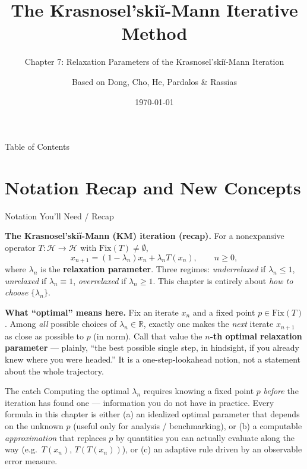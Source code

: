 \documentclass[aspectratio=169,10pt]{beamer}
\title[KM Method -- Ch.7]{The Krasnosel'ski\u{i}-Mann Iterative Method}
\subtitle{Chapter 7: Relaxation Parameters of the Krasnosel'ski\u{i}-Mann Iteration}
\author{Based on Dong, Cho, He, Pardalos \& Rassias}
\date{\today}
\newcommand{\mHH}{\mathcal H}
\newcommand{\Fix}{\mathrm{Fix}}
\newcommand{\R}{\mathbb{R}}
\begin{document}
\begin{frame}
  \titlepage
\end{frame}

\begin{frame}{Table of Contents}
  \tableofcontents
\end{frame}

\section{Notation Recap and New Concepts}

\begin{frame}[allowframebreaks]{Notation You'll Need / Recap}

  \textbf{The Krasnosel'ski\u{i}-Mann (KM) iteration (recap).} For a
  nonexpansive operator $T:\mHH\to\mHH$ with $\Fix(T)\neq\emptyset$,
  \[
    x_{n+1} = (1-\lambda_n)x_n + \lambda_n T(x_n), \qquad n\ge 0,
  \]
  where $\lambda_n$ is the \textbf{relaxation parameter}. Three
  regimes: \emph{underrelaxed} if $\lambda_n\le1$, \emph{unrelaxed}
  if $\lambda_n\equiv1$, \emph{overrelaxed} if $\lambda_n\ge1$. This
  chapter is entirely about \emph{how to choose} $\{\lambda_n\}$.

  \vspace{0.3em}
  \textbf{What ``optimal'' means here.} Fix an iterate $x_n$ and a
  fixed point $p\in\Fix(T)$. Among \emph{all} possible choices of
  $\lambda_n\in\R$, exactly one makes the \emph{next} iterate
  $x_{n+1}$ as close as possible to $p$ (in norm). Call that value
  the \textbf{$n$-th optimal relaxation parameter} --- plainly, ``the
  best possible single step, in hindsight, if you already knew where
  you were headed.'' It is a one-step-lookahead notion, not a
  statement about the whole trajectory.

  \begin{alertblock}{The catch}
    Computing the optimal $\lambda_n$ requires knowing a fixed point
    $p$ \emph{before} the iteration has found one --- information you
    do not have in practice. Every formula in this chapter is either
    (a) an idealized optimal parameter that depends on the unknown
    $p$ (useful only for analysis / benchmarking), or (b) a
    computable \emph{approximation} that replaces $p$ by quantities
    you can actually evaluate along the way (e.g.\ $T(x_n)$,
    $T(T(x_n))$), or (c) an adaptive rule driven by an observable
    error measure.
  \end{alertblock}


\end{frame}
\end{document}
